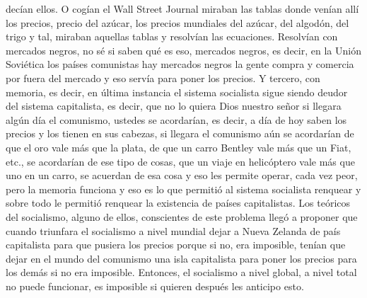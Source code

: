 decían ellos. O cogían el Wall Street Journal miraban las tablas donde venían allí los precios, precio del azúcar, los precios mundiales del azúcar, del algodón, del trigo y tal, miraban aquellas tablas y resolvían las ecuaciones. Resolvían con mercados negros, no sé si saben qué es eso, mercados negros, es decir, en la Unión Soviética los países comunistas hay mercados negros la gente compra y comercia por fuera del mercado y eso servía para poner los precios. Y tercero, con memoria, es decir, en última instancia el sistema socialista sigue siendo deudor del sistema capitalista, es decir, que no lo quiera Dios nuestro señor si llegara algún día el comunismo, ustedes se acordarían, es decir, a día de hoy saben los precios y los tienen en sus cabezas, si llegara el comunismo aún se acordarían de que el oro vale más que la plata, de que un carro Bentley vale más que un Fiat, etc., se acordarían de ese tipo de cosas, que un viaje en helicóptero vale más que uno en un carro, se acuerdan de esa cosa y eso les permite operar, cada vez peor, pero la memoria funciona y eso es lo que permitió al sistema socialista renquear y sobre todo le permitió renquear la existencia de países capitalistas. Los teóricos del socialismo, alguno de ellos, conscientes de este problema llegó a proponer que cuando triunfara el socialismo a nivel mundial dejar a Nueva Zelanda de país capitalista para que pusiera los precios porque si no, era imposible, tenían que dejar en el mundo del comunismo una isla capitalista para poner los precios para los demás si no era imposible. Entonces, el socialismo a nivel global, a nivel total no puede funcionar, es imposible si quieren después les anticipo esto.

